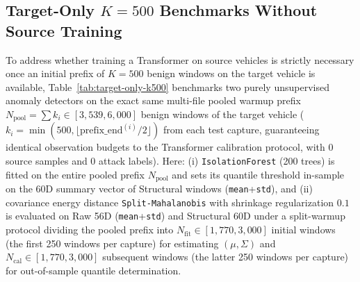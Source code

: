 \documentclass[12pt, a4paper, reqno, oneside]{book}
\DeclareRobustCommand{\code}[1]{\nolinkurl{#1}}
\begin{document}
{{\subsection{Target-Only \texorpdfstring{$K=500$}{K=500} Benchmarks Without Source Training}\label{subsec:target-only-k500}
To address whether training a Transformer on source vehicles is strictly necessary once an initial prefix of $K=500$ benign windows on the target vehicle is available, Table~\ref{tab:target-only-k500} benchmarks two purely unsupervised anomaly detectors on the exact same multi-file pooled warmup prefix $N_{\text{pool}} = \sum k_i \in [3{,}539, 6{,}000]$ benign windows of the target vehicle ($k_i = \min(500, \lfloor\mathrm{prefix\_end}^{(i)}/2\rfloor)$ from each test capture, guaranteeing identical observation budgets to the Transformer calibration protocol, with 0 source samples and 0 attack labels). Here: (i) \code{IsolationForest} (200 trees) is fitted on the entire pooled prefix $N_{\text{pool}}$ and sets its quantile threshold in-sample on the 60D summary vector of Structural windows (\code{mean}+\code{std}), and (ii) covariance energy distance \code{Split-Mahalanobis} with shrinkage regularization $0.1$ is evaluated on Raw 56D (\code{mean}+\code{std}) and Structural 60D under a split-warmup protocol dividing the pooled prefix into $N_{\text{fit}} \in [1{,}770, 3{,}000]$ initial windows (the first 250 windows per capture) for estimating $(\mu, \Sigma)$ and $N_{\text{cal}} \in [1{,}770, 3{,}000]$ subsequent windows (the latter 250 windows per capture) for out-of-sample quantile determination.

}}
\end{document}
